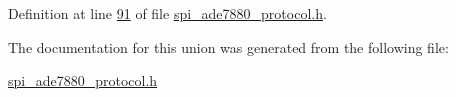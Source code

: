 Definition at line \hyperlink{a00041_source_l00091}{91} of file \hyperlink{a00041_source}{spi\-\_\-ade7880\-\_\-protocol.\-h}.



The documentation for this union was generated from the following file\-:\begin{DoxyCompactItemize}
\item 
\hyperlink{a00041}{spi\-\_\-ade7880\-\_\-protocol.\-h}\end{DoxyCompactItemize}
